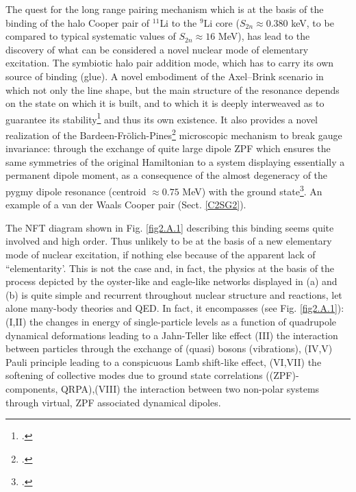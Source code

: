 The quest for the long range pairing mechanism which is at the basis of the binding of the halo Cooper pair of $^{11}$Li to the $^9$Li core ($S_{2n}\approx0.380$ keV, to be compared to typical systematic values of $S_{2n}\approx 16$ MeV), has lead to the discovery of what can be considered a novel nuclear mode of elementary excitation. The symbiotic halo pair addition mode, which has to carry its own source of binding (glue). A novel embodiment of the Axel--Brink scenario in which not only the line shape, but the main structure of the resonance depends on the state on which it is built, and to which it is deeply interweaved as to guarantee its stability\footnote{\cite{Axel:62,Brink:55}.} and thus its own existence. It also provides a novel realization of the Bardeen-Fr\"olich-Pines\footnote{\cite{Bardeen:55,Frohlich:52}.} microscopic mechanism to break gauge invariance: 
through the exchange of quite large dipole ZPF which ensures the same symmetries of the original Hamiltonian to a system displaying essentially a permanent dipole moment, as a consequence of the almost degeneracy of the  pygmy dipole resonance (centroid $\approx0.75$ MeV) 
 with the ground state\footnote{\cite{Aumann:19}.}. An example of a van der Waals Cooper pair (Sect. \ref{C2SG2}).



The NFT diagram shown in Fig. \ref{fig2.A.1} describing this binding seems quite involved and high order. Thus unlikely to be at the basis of a new elementary mode of nuclear excitation, if nothing else because of the apparent lack of ``elementarity'. This is not the case and, in fact, the physics at the basis of the process depicted by the oyster-like and eagle-like networks displayed in (a) and (b) is quite simple and recurrent throughout nuclear structure and reactions, let alone many-body theories and QED. In fact, it encompasses (see Fig. \ref{fig2.A.1}): (I,II)  the changes in energy of single-particle levels as a function of  quadrupole dynamical deformations leading to a Jahn-Teller like effect (III) the interaction between particles through the exchange of (quasi) bosons (vibrations), (IV,V) Pauli principle leading to a conspicuous Lamb shift-like effect, (VI,VII) the softening of collective modes due to ground state correlations ((ZPF)-components, QRPA),(VIII) the interaction between two non-polar systems through virtual, ZPF associated dynamical dipoles.


